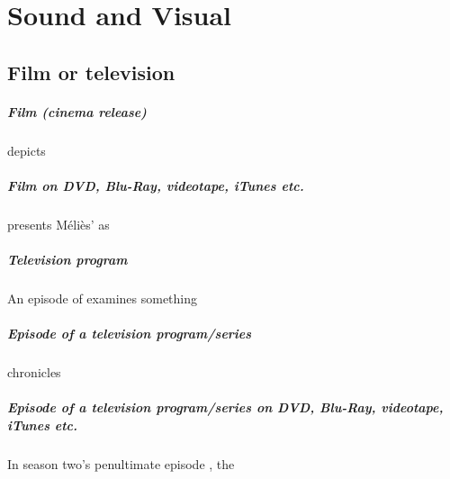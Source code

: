 \documentclass[a4paper,australian,oneside,12pt,footlines=3]{scrbook}%
\theoremstyle{remark}
\begin{document}
\chapter{Sound and Visual}
\begin{refsection}
\section{Film or television}
\paragraph{Film (cinema release)}
\nocite{TheMaster}
\textcite{DjangoMovie} depicts\textelp{}

\paragraph{Film on DVD, Blu-Ray, videotape, iTunes etc.}
\textcite{Hugo} presents Méliès' as\textelp{}

\paragraph{Television program}	
An episode of \textcite{Dateline} examines something \parencite{Dateline}

\paragraph{Episode of a television program/series}
\nocite{Coulter2010}
\textcite{56up} chronicles\textelp{}

\paragraph{Episode of a television program/series on DVD, Blu-Ray, videotape, iTunes etc.}
In season two’s penultimate episode \textcite{GameOfThrones}, the\textelp{}
\printbibliography[heading=subbibliography]
\end{refsection}
\end{document}
